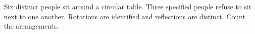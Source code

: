 Six distinct people sit around a circular table. Three specified people refuse to sit next to one another. Rotations are identified and reflections are distinct. Count the arrangements.
